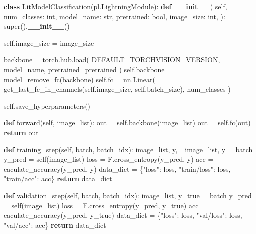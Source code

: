 \documentclass[]{article}
\newenvironment{Shaded}{\begin{snugshade}}{\end{snugshade}}
\newcommand{\BuiltInTok}[1]{\textcolor[rgb]{0.74,0.68,0.62}{#1}}
\newcommand{\ControlFlowTok}[1]{\textcolor[rgb]{0.26,0.66,0.93}{\textbf{#1}}}
\newcommand{\FunctionTok}[1]{\textcolor[rgb]{1.00,0.58,0.35}{\textbf{#1}}}
\newcommand{\KeywordTok}[1]{\textcolor[rgb]{0.26,0.66,0.93}{\textbf{#1}}}
\newcommand{\NormalTok}[1]{\textcolor[rgb]{0.74,0.68,0.62}{#1}}
\newcommand{\OperatorTok}[1]{\textcolor[rgb]{0.74,0.68,0.62}{#1}}
\newcommand{\StringTok}[1]{\textcolor[rgb]{0.02,0.61,0.04}{#1}}
\newcommand{\VariableTok}[1]{\textcolor[rgb]{0.74,0.68,0.62}{#1}}
\begin{document}
\begin{Shaded}
\begin{Highlighting}[]
\KeywordTok{class}\NormalTok{ LitModelClassification(pl.LightningModule):}
    \KeywordTok{def} \FunctionTok{__init__}\NormalTok{(}
        \VariableTok{self}\NormalTok{,}
\NormalTok{        num_classes: }\BuiltInTok{int}\NormalTok{,}
\NormalTok{        model_name: }\BuiltInTok{str}\NormalTok{,}
\NormalTok{        pretrained: }\BuiltInTok{bool}\NormalTok{,}
\NormalTok{        image_size: }\BuiltInTok{int}\NormalTok{,}
\NormalTok{    ):}
        \BuiltInTok{super}\NormalTok{().}\FunctionTok{__init__}\NormalTok{()}

        \VariableTok{self}\NormalTok{.image_size }\OperatorTok{=}\NormalTok{ image_size}

\NormalTok{        backbone }\OperatorTok{=}\NormalTok{ torch.hub.load(}
\NormalTok{            DEFAULT_TORCHVISION_VERSION, model_name, pretrained}\OperatorTok{=}\NormalTok{pretrained}
\NormalTok{        )}
        \VariableTok{self}\NormalTok{.backbone }\OperatorTok{=}\NormalTok{ model_remove_fc(backbone)}
        \VariableTok{self}\NormalTok{.fc }\OperatorTok{=}\NormalTok{ nn.Linear(}
\NormalTok{            get_last_fc_in_channels(}\VariableTok{self}\NormalTok{.image_size, }\VariableTok{self}\NormalTok{.batch_size), num_classes}
\NormalTok{        )}

        \VariableTok{self}\NormalTok{.save_hyperparameters()}

    \KeywordTok{def}\NormalTok{ forward(}\VariableTok{self}\NormalTok{, image_list):}
\NormalTok{        out }\OperatorTok{=} \VariableTok{self}\NormalTok{.backbone(image_list)}
\NormalTok{        out }\OperatorTok{=} \VariableTok{self}\NormalTok{.fc(out)}
        \ControlFlowTok{return}\NormalTok{ out}

    \KeywordTok{def}\NormalTok{ training_step(}\VariableTok{self}\NormalTok{, batch, batch_idx):}
\NormalTok{        image_list, y, _image_list, y }\OperatorTok{=}\NormalTok{ batch}
\NormalTok{        y_pred }\OperatorTok{=} \VariableTok{self}\NormalTok{(image_list)}
\NormalTok{        loss }\OperatorTok{=}\NormalTok{ F.cross_entropy(y_pred, y)}
\NormalTok{        acc }\OperatorTok{=}\NormalTok{ caculate_accuracy(y_pred, y)}
\NormalTok{        data_dict }\OperatorTok{=}\NormalTok{ \{}\StringTok{"loss"}\NormalTok{: loss, }\StringTok{"train/loss"}\NormalTok{: loss, }\StringTok{"train/acc"}\NormalTok{: acc\}}
        \ControlFlowTok{return}\NormalTok{ data_dict}

    \KeywordTok{def}\NormalTok{ validation_step(}\VariableTok{self}\NormalTok{, batch, batch_idx):}
\NormalTok{        image_list, y_true }\OperatorTok{=}\NormalTok{ batch}
\NormalTok{        y_pred }\OperatorTok{=} \VariableTok{self}\NormalTok{(image_list)}
\NormalTok{        loss }\OperatorTok{=}\NormalTok{ F.cross_entropy(y_pred, y_true)}
\NormalTok{        acc }\OperatorTok{=}\NormalTok{ caculate_accuracy(y_pred, y_true)}
\NormalTok{        data_dict }\OperatorTok{=}\NormalTok{ \{}\StringTok{"loss"}\NormalTok{: loss, }\StringTok{"val/loss"}\NormalTok{: loss, }\StringTok{"val/acc"}\NormalTok{: acc\}}
        \ControlFlowTok{return}\NormalTok{ data_dict}


\end{Highlighting}
\end{Shaded}
\end{document}
